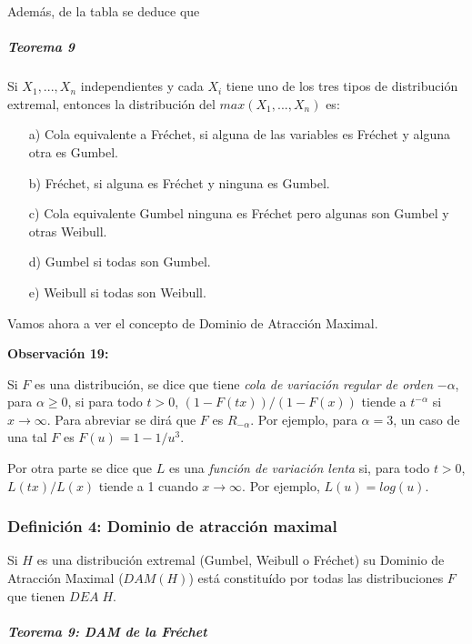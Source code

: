 \documentclass[
  oneside]{article}
\begin{document}
Además, de la tabla se deduce que

\hypertarget{teorema-9}{%
\subparagraph{Teorema 9}\label{teorema-9}}

Si \(X_1,...,X_n\) independientes y cada \(X_i\) tiene uno de los tres
tipos de distribución extremal, entonces la distribución del
\(max(X_1,...,X_n)\) es:

\begin{itemize}
\item[a)] Cola equivalente a Fréchet, si alguna de las variables es Fréchet y alguna otra es Gumbel.
\item[b)]  Fréchet, si alguna es Fréchet y ninguna es Gumbel.
\item[c)]  Cola equivalente Gumbel ninguna es Fréchet pero algunas son Gumbel y otras Weibull.
\item[d)] Gumbel si todas son Gumbel.
\item[e)]  Weibull si todas son Weibull.
\end{itemize}

Vamos ahora a ver el concepto de Dominio de Atracción Maximal.

\textbf{Observación 19:}

Si \(F\) es una distribución, se dice que tiene
\textit{cola de variación regular de orden} \(-\alpha\), para
\(\alpha \geq 0\), si para todo \(t>0\), \((1-F(tx))/(1-F(x))\) tiende a
\(t^{-\alpha}\) si \(x \rightarrow \infty\). Para abreviar se dirá que
\(F\) es \(R_{-\alpha}\). Por ejemplo, para \(\alpha=3\), un caso de una
tal \(F\) es \(F(u)=1- 1/u^3\).

Por otra parte se dice que \(L\) es una
\textit{función de variación lenta} si, para todo \(t>0\),
\(L(tx)/L(x)\) tiende a 1 cuando \(x \rightarrow \infty\). Por ejemplo,
\(L(u)=log(u)\).

\newpage

\hypertarget{definiciuxf3n-4-dominio-de-atracciuxf3n-maximal}{%
\subsubsection{Definición 4: Dominio de atracción
maximal}\label{definiciuxf3n-4-dominio-de-atracciuxf3n-maximal}}

Si \(H\) es una distribución extremal (Gumbel, Weibull o Fréchet) su
Dominio de Atracción Maximal (\(DAM(H)\)) está constituído por todas las
distribuciones \(F\) que tienen \(DEA\;H\).

\hypertarget{teorema-9-dam-de-la-fruxe9chet}{%
\subparagraph{Teorema 9: DAM de la
Fréchet}\label{teorema-9-dam-de-la-fruxe9chet}}
\end{document}
